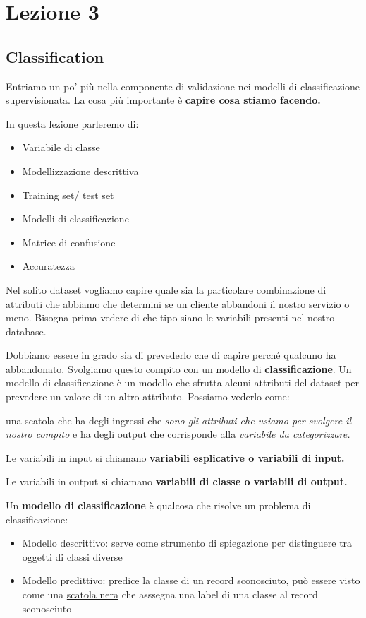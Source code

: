 \section{Lezione 3}
\subsection{Classification}
Entriamo un po' più nella componente di validazione nei modelli di classificazione supervisionata.
La cosa più importante è \textbf{capire cosa stiamo facendo.}

In questa lezione parleremo di:
\begin{itemize}
	\item Variabile di classe
	\item Modellizzazione descrittiva
	\item Training set/ test set
	\item Modelli di classificazione
	\item Matrice di confusione
	\item Accuratezza
\end{itemize}

Nel solito dataset vogliamo capire quale sia la particolare combinazione di attributi che abbiamo che determini se un cliente abbandoni il nostro servizio o meno.
Bisogna prima vedere di che tipo siano le variabili presenti nel nostro database.

Dobbiamo essere in grado sia di prevederlo che di capire perché qualcuno ha abbandonato. Svolgiamo questo compito con un modello di \textbf{classificazione}. Un modello di classificazione è un modello che sfrutta alcuni attributi del dataset per prevedere un valore di un altro attributo.
Possiamo vederlo come:

una scatola che ha degli ingressi che \textit{sono gli attributi che usiamo per svolgere il nostro compito} e ha degli output che corrisponde alla \textit{variabile da categorizzare.}

Le variabili in input si chiamano \textbf{variabili esplicative o variabili di input.}

Le variabili in output si chiamano \textbf{variabili di classe o variabili di output.}

Un \textbf{modello di classificazione} è qualcosa che risolve un problema di classificazione:
\begin{itemize}
	\item Modello descrittivo: serve come strumento di spiegazione per distinguere tra oggetti di classi diverse
	\item Modello predittivo: predice la classe di un record sconosciuto, pu\`o essere visto come una \underline{scatola nera} che asssegna una label di una classe al record sconosciuto
\end{itemize}


